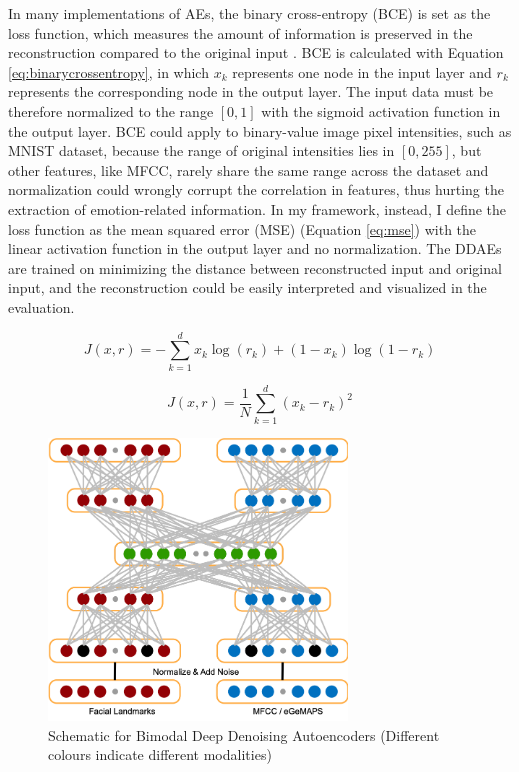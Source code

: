 In many implementations of AEs, the binary cross-entropy (BCE) is set as the loss function, which measures the amount of information is preserved in the reconstruction compared to the original input \cite{de2005}. BCE is calculated with Equation \ref{eq:binarycrossentropy}, in which $x_k$ represents one node in the input layer and $r_k$ represents the corresponding node in the output layer. The input data must be therefore normalized to the range $[0,1]$ with the sigmoid activation function in the output layer. BCE could apply to binary-value image pixel intensities, such as MNIST dataset, because the range of original intensities lies in $[0, 255]$, but other features, like MFCC, rarely share the same range across the dataset and normalization could wrongly corrupt the correlation in features, thus hurting the extraction of emotion-related information. In my framework, instead, I define the loss function as the mean squared error (MSE) (Equation \ref{eq:mse}) with the linear activation function in the output layer and no normalization. The DDAEs are trained on minimizing the distance between reconstructed input and original input, and the reconstruction could be easily interpreted and visualized in the evaluation.

\begin{equation}
    J(x,r) = - \sum_{k=1}^d x_k \log(r_k) + (1-x_k) \log(1-r_k)
    \label{eq:binarycrossentropy}
\end{equation}

\begin{equation}
    J(x,r) = \frac{1}{N} \sum_{k=1}^d (x_k - r_k)^2
    \label{eq:mse}
\end{equation}


\begin{figure}[ht]
    \centering
    \includegraphics[height=7.5cm]{images/design/bimodal_ae.png}
    \caption{Schematic for Bimodal Deep Denoising Autoencoders (Different colours indicate different modalities)}
    \label{fig:bimodal_ae}
\end{figure}


